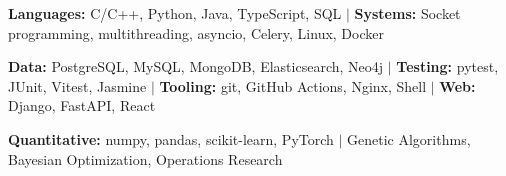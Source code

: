 %
\item\small{\textbf{Languages:} C/C++, Python, Java, TypeScript, SQL $|$ \textbf{Systems:} Socket programming, multithreading, asyncio, Celery, Linux, Docker}
\item\small{\textbf{Data:} PostgreSQL, MySQL, MongoDB, Elasticsearch, Neo4j $|$ \textbf{Testing:} pytest, JUnit, Vitest, Jasmine $|$ \textbf{Tooling:} git, GitHub Actions, Nginx, Shell $|$ \textbf{Web:} Django, FastAPI, React}
\item\small{\textbf{Quantitative:} numpy, pandas, scikit-learn, PyTorch $|$ Genetic Algorithms, Bayesian Optimization, Operations Research}%
